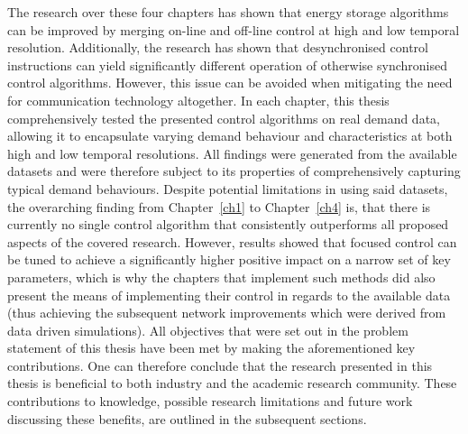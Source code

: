 The research over these four chapters has shown that energy storage algorithms can be improved by merging on-line and off-line control at high and low temporal resolution.
Additionally, the research has shown that desynchronised control instructions can yield significantly different operation of otherwise synchronised control algorithms.
However, this issue can be avoided when mitigating the need for communication technology altogether.
In each chapter, this thesis comprehensively tested the presented control algorithms on real demand data, allowing it to encapsulate varying demand behaviour and characteristics at both high and low temporal resolutions.
All findings were generated from the available datasets and were therefore subject to its properties of comprehensively capturing typical demand behaviours.
Despite potential limitations in using said datasets, the overarching finding from Chapter~\ref{ch1} to Chapter~\ref{ch4} is, that there is currently no single control algorithm that consistently outperforms all proposed aspects of the covered research.
However, results showed that focused control can be tuned to achieve a significantly higher positive impact on a narrow set of key parameters, which is why the chapters that implement such methods did also present the means of implementing their control in regards to the available data (thus achieving the subsequent network improvements which were derived from data driven simulations).
All objectives that were set out in the problem statement of this thesis have been met by making the aforementioned key contributions.
One can therefore conclude that the research presented in this thesis is beneficial to both industry and the academic research community.
These contributions to knowledge, possible research limitations and future work discussing these benefits, are outlined in the subsequent sections.

